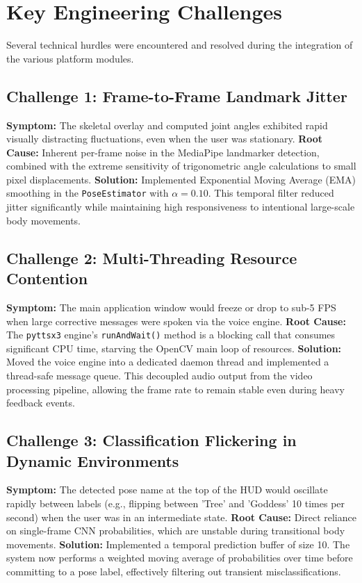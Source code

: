 \section{Key Engineering Challenges}
Several technical hurdles were encountered and resolved during the integration of the various platform modules.

\subsection{Challenge 1: Frame-to-Frame Landmark Jitter}
\textbf{Symptom:} The skeletal overlay and computed joint angles exhibited rapid visually distracting fluctuations, even when the user was stationary.
\textbf{Root Cause:} Inherent per-frame noise in the MediaPipe landmarker detection, combined with the extreme sensitivity of trigonometric angle calculations to small pixel displacements.
\textbf{Solution:} Implemented Exponential Moving Average (EMA) smoothing in the \texttt{PoseEstimator} with $\alpha=0.10$. This temporal filter reduced jitter significantly while maintaining high responsiveness to intentional large-scale body movements.

\subsection{Challenge 2: Multi-Threading Resource Contention}
\textbf{Symptom:} The main application window would freeze or drop to sub-5 FPS when large corrective messages were spoken via the voice engine.
\textbf{Root Cause:} The \texttt{pyttsx3} engine's \texttt{runAndWait()} method is a blocking call that consumes significant CPU time, starving the OpenCV main loop of resources.
\textbf{Solution:} Moved the voice engine into a dedicated daemon thread and implemented a thread-safe message queue. This decoupled audio output from the video processing pipeline, allowing the frame rate to remain stable even during heavy feedback events.

\subsection{Challenge 3: Classification Flickering in Dynamic Environments}
\textbf{Symptom:} The detected pose name at the top of the HUD would oscillate rapidly between labels (e.g., flipping between 'Tree' and 'Goddess' 10 times per second) when the user was in an intermediate state.
\textbf{Root Cause:} Direct reliance on single-frame CNN probabilities, which are unstable during transitional body movements.
\textbf{Solution:} Implemented a temporal prediction buffer of size 10. The system now performs a weighted moving average of probabilities over time before committing to a pose label, effectively filtering out transient misclassifications.

